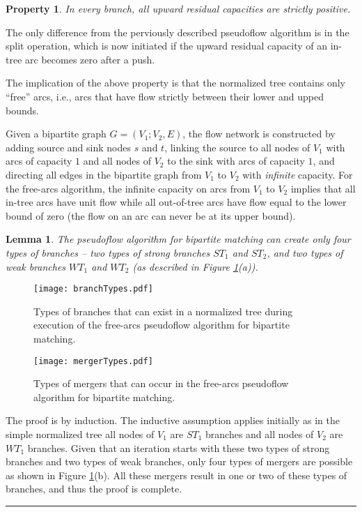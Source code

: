 \documentclass{article}
\newtheorem{lemma}{Lemma}[section]
\newtheorem{property}{Property}[section]
\newenvironment{proof}[1][Proof:]{\begin{trivlist}
\item[\hskip \labelsep {\bfseries #1}]}{\end{trivlist}}
\newcommand{\qed}{\hfill \rule{2.5mm}{2.5mm}}
\begin{document}
\begin{property}
\label{property:normtreeupward}
In every branch, all upward residual capacities are strictly positive.
\end{property}

The only difference from the perviously described pseudoflow algorithm is in the {\sf split} operation, which is now initiated if the upward residual capacity of an in-tree arc becomes zero after a push.

The implication of the above property is that the normalized tree contains only ``free'' arcs, i.e., arcs that have flow strictly between their lower and upped bounds.

Given a bipartite graph $G = (V_1; V_2, E)$, the flow network is constructed by adding source and sink nodes $s$ and $t$, linking the source to all nodes of $V_1$ with arcs of capacity $1$ and all nodes of $V_2$ to the sink with arcs of capacity $1$, and directing all edges in the bipartite graph from $V_1$ to $V_2$ with {\em infinite} capacity.  For the free-arcs algorithm, the infinite capacity on arcs from $V_1$ to $V_2$ implies that all in-tree arcs have unit flow while all out-of-tree arcs have flow equal to the lower bound of zero (the flow on an arc can never be at its upper bound).

\begin{lemma}
\label{lem:branchtypes} The pseudoflow algorithm for bipartite matching can create only four types of branches -- two types of strong branches $ST_1$ and $ST_2$, and two types of weak branches $WT_1$ and $WT_2$ (as described in Figure \ref{fig:branchtypes}(a)).
\end{lemma}

\begin{figure}[ht]
\centerline{\texttt{[image: branchTypes.pdf]}}
\caption{\label{fig:branchtypes}Types of branches that can exist in a normalized tree during execution of the free-arcs pseudoflow algorithm for bipartite matching.}
\end{figure}

\begin{figure}[ht]
\centerline{\texttt{[image: mergerTypes.pdf]}}
\caption{\label{fig:mergertypes}Types of mergers that can occur in the free-arcs pseudoflow algorithm for bipartite matching.}
\end{figure}

\begin{proof}
The proof is by induction.  The inductive assumption applies initially as in the simple normalized tree all nodes of $V_1$ are $ST_1$ branches and all nodes of $V_2$ are $WT_1$ branches.  Given that an iteration starts with these two types of strong branches and two types of weak branches, only four types of mergers are possible as shown in Figure \ref{fig:branchtypes}(b).  All these mergers result in one or two of these types of branches, and thus the proof is complete. \qed
\end{proof}
\end{document}

